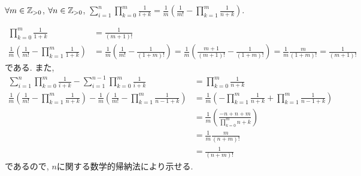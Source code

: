 \begin{prop}
  \label{p:20230728}
  $\forall m \in \mathbb{Z}_{>0}$,
  $\forall n \in \mathbb{Z}_{>0}$,
  $\sum_{i=1}^n\prod_{k=0}^{m}\frac{1}{i+k}=\frac{1}{m}\left(\frac{1}{m!}-\prod_{k=1}^m\frac{1}{n+k}\right)$.
\end{prop}
\begin{proof**}
  \begin{align*}
    \prod_{k=0}^{m}\frac{1}{1+k}&=\frac{1}{(m+1)!}\\
    \frac{1}{m}\left(\frac{1}{m!}-\prod_{k=1}^m\frac{1}{1+k}\right)
    &=\frac{1}{m}\left(\frac{1}{m!}-\frac{1}{(1+m)!}\right)
    =\frac{1}{m}\left(\frac{m+1}{(m+1)!}-\frac{1}{(1+m)!}\right)
    =\frac{1}{m}\frac{m}{(1+m)!}=\frac{1}{(m+1)!}
  \end{align*}
  である.
  また,
  \begin{align*}
    \sum_{i=1}^n\prod_{k=0}^{m}\frac{1}{i+k}
    -\sum_{i=1}^{n-1}\prod_{k=0}^{m}\frac{1}{i+k}
    &=\prod_{k=0}^{m}\frac{1}{n+k}\\
    \frac{1}{m}\left(\frac{1}{m!}-\prod_{k=1}^m\frac{1}{n+k}\right)
    -\frac{1}{m}\left(\frac{1}{m!}-\prod_{k=1}^m\frac{1}{n-1+k}\right)
    &=\frac{1}{m}\left(-\prod_{k=1}^m\frac{1}{n+k}+\prod_{k=1}^m\frac{1}{n-1+k}\right)\\
    &=\frac{1}{m}\left(\frac{-n+n+m}{\prod_{k=0}^m n+k}\right)\\
    &=\frac{1}{m}\frac{m}{(n+m)!}\\
    &=\frac{1}{(n+m)!}
  \end{align*}
  であるので,
  $n$に関する数学的帰納法により示せる.
\end{proof**}

